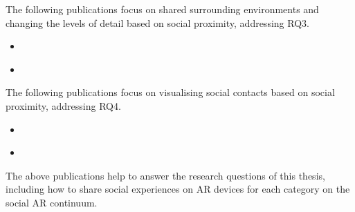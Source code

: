 The following publications focus on shared surrounding environments and changing the levels of detail based on social proximity, addressing RQ3.

\begin{itemize}
    \item{ }
    \item{ }
\end{itemize}

The following publications focus on visualising social contacts based on social proximity, addressing RQ4. 

\begin{itemize}
    \item{ }
    \item{ }
\end{itemize}

The above publications help to answer the research questions of this thesis, including how to share social experiences on AR devices for each category on the social AR continuum. 



